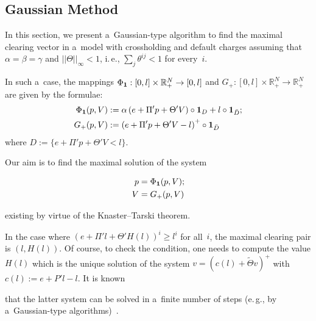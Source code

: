 \begin{multicols}{2}
\section{Gaussian Method}

\noindent
In this section, we present a~Gaussian-type   algorithm to find the maximal clearing vector in a~model with crossholding and 
default charges assuming that  $\alpha=\beta=\gamma$ and $||\Theta||_\infty<1$, 
 i.\,e., $\sum\nolimits_j \theta^{ij} < 1$ for every~$i$. 


In such a~case,   the mappings $\Phi_{\bf 1}:[0, l]\times  \mathbb{R}^N_+\to [0,l]$ and $G_+:[0, l]\times  \mathbb{R}^N_+\to \mathbb{R}^N_+$ 
are given by the formulae: 
\begin{align*}
 \Phi_{\bf 1}(p, V)&: = \alpha \left(e +  \Pi' p +  \Theta' V\right) \circ {\bf 1}_{D} + l \circ {\bf 1}_{\bar D}; \\
G_+(p, V) &:= \left(e + \Pi' p + \Theta' V - l\right)^+ \circ {\bf 1}_{\bar D}
\end{align*}
where $D := \{ e + \Pi' p + \Theta' V <  l  \}$. 

Our aim is to find the maximal solution of the  system 

\vspace*{-4pt}

\noindent
\begin{align*}
p&=\Phi_{\bf 1}(p, V) ; \\
V&=G_+(p, V) 
\end{align*}

\vspace*{-4pt}

\noindent
existing by virtue of the Knaster--Tarski theorem. 

In the case where 
 $(e + \Pi' l + \Theta' H(l))^i \ge   l^i $ for all~$i$,    the maximal clearing pair  is 
$(l,H(l))$. Of course, to check the condition,  one needs to compute the value $H(l)$ which 
is the unique solution of the system  $v=(c(l)+\tilde \Theta v)^+$ with $c(l):=e+P'l-l$.  It is known\linebreak\vspace*{-12pt}

\columnbreak

\noindent
 that the latter system
can be solved in a~finite number of steps (e.\,g.,  by a~Gaussian-type algorithms)~\cite{kabanov2018clearing}. 



\end{multicols}
